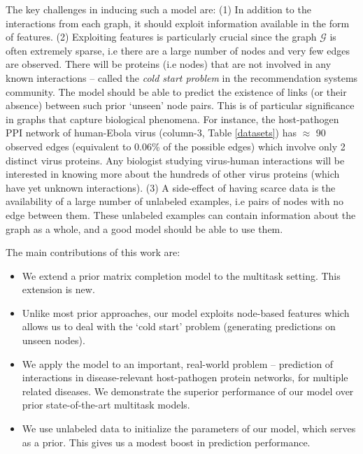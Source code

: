 \documentclass[runningheads,a4paper]{llncs}
\begin{document}
The key challenges in inducing such a model are: (1) In addition to the interactions from each graph, it should exploit information available in the form of features. 
(2) Exploiting features is particularly crucial since the graph $\mathcal{G}$ is often extremely sparse, i.e there are a large number of nodes and very few edges are observed. 
There will be proteins (i.e nodes) that are not involved in any known interactions -- called the \textit{cold start problem} in the recommendation systems community. 
The model should be able to predict the existence of links (or their absence) between such prior `unseen' node pairs. 
This is of particular significance in graphs that capture biological phenomena. For instance, the host-pathogen PPI network
of human-Ebola virus (column-3, Table \ref{datasets}) has $\approx$ 90 observed edges (equivalent to 0.06\% of the possible edges) which involve only 2 distinct virus proteins. Any biologist studying virus-human interactions will be interested in knowing more about the hundreds of other virus proteins (which have yet unknown interactions).
(3) A side-effect of having scarce data is the availability of a large number of unlabeled examples, 
i.e pairs of nodes with no edge between them. 
These unlabeled examples can contain information about the graph as a whole, and a good model should be able to use them.

The main contributions of this work are:
\begin{itemize}
\item We extend a prior matrix completion model \citep{abernethy} to the multitask setting. This extension is new.
\item Unlike most prior approaches, our model exploits node-based features which allows us to deal with the `cold start' problem (generating predictions on unseen nodes).
\item We apply the model to an important, real-world problem -- prediction of interactions in disease-relevant host-pathogen protein networks, for multiple related diseases. We demonstrate the superior performance of our model over prior state-of-the-art multitask models.
\item We use unlabeled data to initialize the parameters of our model, which serves as a prior. This gives us a modest boost in prediction performance.
\end{itemize}
\end{document}
